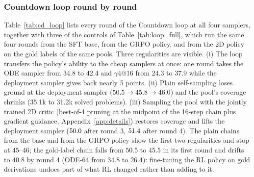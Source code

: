 \subsubsection{Countdown loop round by round}
\label{app:cd_loop}
Table~\ref{tab:cd_loop} lists every round of the Countdown loop at all four samplers, together with three of the controls of Table~\ref{tab:loop_full}, which run the same four rounds from the SFT base, from the GRPO policy, and from the 2D policy on the gold labels of the same pools. Three regularities are visible. (i) The loop transfers the policy's ability to the cheap samplers at once: one round takes the ODE sampler from $34.8$ to $42.4$ and $\gamma4$@16 from $24.3$ to $37.9$ while the deployment sampler gives back nearly 5 points. (ii) Plain self-sampling loses ground at the deployment sampler ($50.5\to45.8\to46.0$) and the pool's coverage shrinks (35.1k to 31.2k solved problems). (iii) Sampling the pool with the jointly trained 2D critic (best-of-4 pruning at the midpoint of the 16-step chain plus gradient guidance, Appendix~\ref{app:details}) restores coverage and lifts the deployment sampler ($50.0$ after round 3, $51.4$ after round 4). The plain chains from the base and from the GRPO policy show the first two regularities and stop at $45$--$46$; the gold-label chain falls from $50.5$ to $45.5$ in its first round and drifts to $40.8$ by round 4 (ODE-64 from $34.8$ to $26.4$): fine-tuning the RL policy on gold derivations undoes part of what RL changed rather than adding to it.

